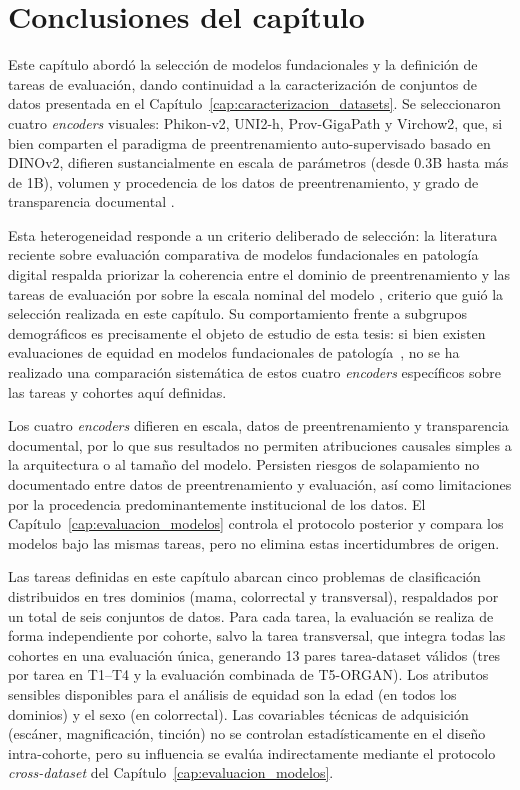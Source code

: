 \section{Conclusiones del capítulo}

Este capítulo abordó la selección de modelos fundacionales y la definición
de tareas de evaluación, dando continuidad a la caracterización de conjuntos
de datos presentada en el Capítulo~\ref{cap:caracterizacion_datasets}. Se seleccionaron
cuatro \textit{encoders} visuales: Phikon-v2, UNI2-h, Prov-GigaPath y Virchow2, que,
si bien comparten el paradigma de preentrenamiento auto-supervisado basado en
DINOv2, difieren sustancialmente en escala de parámetros (desde 0.3B hasta
más de 1B), volumen y procedencia de los datos de preentrenamiento, y grado
de transparencia documental \citep{filiot2024phikonv2,chen2024uni,xu2024provgigapath,vorontsov2024virchow}.

Esta heterogeneidad responde a un criterio deliberado de selección: la literatura
reciente sobre evaluación comparativa de modelos fundacionales en patología digital
respalda priorizar la coherencia entre el dominio de preentrenamiento y las tareas
de evaluación por sobre la escala nominal del modelo \citep{filiot2024phikonv2},
criterio que guió la selección realizada en este capítulo. Su comportamiento frente
a subgrupos demográficos es precisamente el objeto de estudio de esta tesis: si bien
existen evaluaciones de equidad en modelos fundacionales de patología~\parencite{lin2025fairpath, huang2025flex},
no se ha realizado una comparación sistemática de estos cuatro \textit{encoders} específicos
sobre las tareas y cohortes aquí definidas.

Los cuatro \textit{encoders} difieren en escala, datos de preentrenamiento y transparencia documental, por lo que sus resultados no permiten atribuciones causales simples a la arquitectura o al tamaño del modelo. Persisten riesgos de solapamiento no documentado entre datos de preentrenamiento y evaluación, así como limitaciones por la procedencia predominantemente institucional de los datos. El Capítulo~\ref{cap:evaluacion_modelos} controla el protocolo posterior y compara los modelos bajo las mismas tareas, pero no elimina estas incertidumbres de origen.

Las tareas definidas en este capítulo abarcan cinco problemas de clasificación distribuidos en tres dominios (mama, colorrectal y transversal), respaldados por un total de seis conjuntos de datos. Para cada tarea, la evaluación se realiza de forma independiente por cohorte, salvo la tarea transversal, que integra todas las cohortes en una evaluación única, generando 13 pares tarea-dataset válidos (tres por tarea en T1--T4 y la evaluación combinada de T5-ORGAN). Los atributos sensibles disponibles para el análisis de equidad son la edad (en todos los dominios) y el sexo (en colorrectal). Las covariables técnicas de adquisición (escáner, magnificación, tinción) no se controlan estadísticamente en el diseño intra-cohorte, pero su influencia se evalúa indirectamente mediante el protocolo \textit{cross-dataset} del Capítulo~\ref{cap:evaluacion_modelos}.
